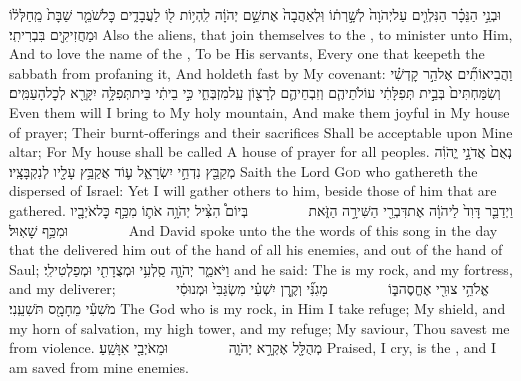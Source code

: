 {וּבְנֵ֣י הַנֵּכָ֗ר הַנִּלְוִ֤ים עַל\maqqaf יְהֹוָה֙ לְשָׁ֣רְת֔וֹ וּֽלְאַהֲבָה֙ אֶת\maqqaf שֵׁ֣ם יְהֹוָ֔ה לִֽהְי֥וֹת ל֖וֹ לַעֲבָדִ֑ים כׇּל\maqqaf שֹׁמֵ֤ר שַׁבָּת֙ מֵֽחַלְּל֔וֹ וּמַחֲזִיקִ֖ים בִּבְרִיתִֽי׃}
{Also the aliens, that join themselves to the \lord, to minister unto Him, And to love the name of the \lord, To be His servants, Every one that keepeth the sabbath from profaning it, And holdeth fast by My covenant:}
{וַהֲבִיאוֹתִ֞ים אֶל\maqqaf הַ֣ר קׇדְשִׁ֗י וְשִׂמַּחְתִּים֙ בְּבֵ֣ית תְּפִלָּתִ֔י עוֹלֹתֵיהֶ֧ם וְזִבְחֵיהֶ֛ם לְרָצ֖וֹן עַֽל\maqqaf מִזְבְּחִ֑י כִּ֣י בֵיתִ֔י בֵּית\maqqaf תְּפִלָּ֥ה יִקָּרֵ֖א לְכׇל\maqqaf הָעַמִּֽים׃}
{Even them will I bring to My holy mountain, And make them joyful in My house of prayer; Their burnt-offerings and their sacrifices Shall be acceptable upon Mine altar; For My house shall be called A house of prayer for all peoples.}
{נְאֻם֙ אֲדֹנָ֣י יֱהֹוִ֔ה מְקַבֵּ֖ץ נִדְחֵ֣י יִשְׂרָאֵ֑ל ע֛וֹד אֲקַבֵּ֥ץ עָלָ֖יו לְנִקְבָּצָֽיו׃}
{Saith the Lord \textsc{God} who gathereth the dispersed of Israel: Yet I will gather others to him, beside those of him that are gathered.}
\newperek
{}
\label{haft_53}
\setcounter{chap}{22}
\setcounter{verse}{1}
{וַיְדַבֵּ֤ר דָּוִד֙ לַיהֹוָ֔ה אֶת\maqqaf דִּבְרֵ֖י הַשִּׁירָ֣ה הַזֹּ֑את         בְּיוֹם֩ הִצִּ֨יל יְהֹוָ֥ה אֹת֛וֹ מִכַּ֥ף כׇּל\maqqaf אֹיְבָ֖יו וּמִכַּ֥ף שָׁאֽוּל׃        }
{And David spoke unto the \lord\space the words of this song in the day that the \lord\space delivered him out of the hand of all his enemies, and out of the hand of Saul;}
{וַיֹּאמַ֑ר יְהֹוָ֛ה סַֽלְעִ֥י וּמְצֻדָתִ֖י וּמְפַלְטִי\maqqaf לִֽי׃}
{and he said: The \lord\space is my rock, and my fortress, and my deliverer;}
{אֱלֹהֵ֥י צוּרִ֖י אֶחֱסֶה\maqqaf בּ֑וֹ         מָגִנִּ֞י וְקֶ֣רֶן יִשְׁעִ֗י מִשְׂגַּבִּי֙ וּמְנוּסִ֔י         מֹשִׁעִ֕י מֵחָמָ֖ס תֹּשִׁעֵֽנִי׃}
{The God who is my rock, in Him I take refuge; My shield, and my horn of salvation, my high tower, and my refuge; My saviour, Thou savest me from violence.}
{מְהֻלָּ֖ל אֶקְרָ֣א יְהֹוָ֑ה         וּמֵאֹיְבַ֖י אִוָּשֵֽׁעַ׃}
{Praised, I cry, is the \lord, and I am saved from mine enemies.}
